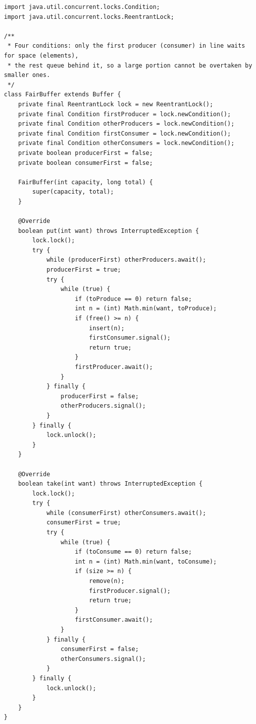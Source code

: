 \documentclass[11pt,a4paper]{article}
\begin{document}
\begin{lstlisting}[caption={Klasa \textbf{FairBuffer} (\texttt{src/FairBuffer.java})}]
import java.util.concurrent.locks.Condition;
import java.util.concurrent.locks.ReentrantLock;

/**
 * Four conditions: only the first producer (consumer) in line waits for space (elements),
 * the rest queue behind it, so a large portion cannot be overtaken by smaller ones.
 */
class FairBuffer extends Buffer {
    private final ReentrantLock lock = new ReentrantLock();
    private final Condition firstProducer = lock.newCondition();
    private final Condition otherProducers = lock.newCondition();
    private final Condition firstConsumer = lock.newCondition();
    private final Condition otherConsumers = lock.newCondition();
    private boolean producerFirst = false;
    private boolean consumerFirst = false;

    FairBuffer(int capacity, long total) {
        super(capacity, total);
    }

    @Override
    boolean put(int want) throws InterruptedException {
        lock.lock();
        try {
            while (producerFirst) otherProducers.await();
            producerFirst = true;
            try {
                while (true) {
                    if (toProduce == 0) return false;
                    int n = (int) Math.min(want, toProduce);
                    if (free() >= n) {
                        insert(n);
                        firstConsumer.signal();
                        return true;
                    }
                    firstProducer.await();
                }
            } finally {
                producerFirst = false;
                otherProducers.signal();
            }
        } finally {
            lock.unlock();
        }
    }

    @Override
    boolean take(int want) throws InterruptedException {
        lock.lock();
        try {
            while (consumerFirst) otherConsumers.await();
            consumerFirst = true;
            try {
                while (true) {
                    if (toConsume == 0) return false;
                    int n = (int) Math.min(want, toConsume);
                    if (size >= n) {
                        remove(n);
                        firstProducer.signal();
                        return true;
                    }
                    firstConsumer.await();
                }
            } finally {
                consumerFirst = false;
                otherConsumers.signal();
            }
        } finally {
            lock.unlock();
        }
    }
}
\end{lstlisting}
\end{document}
